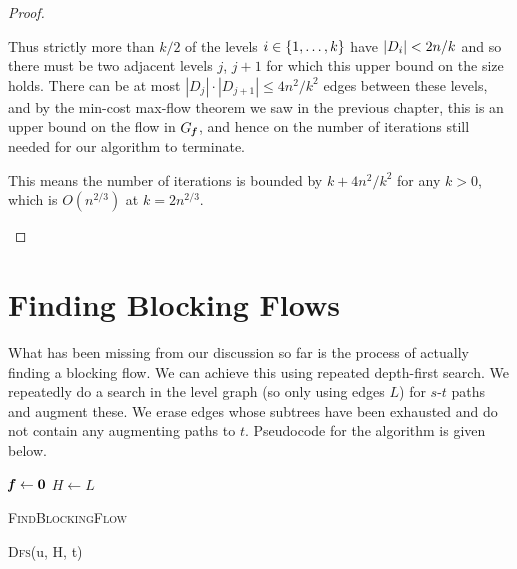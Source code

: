 \begin{proof}
\begin{enumerate}
    Thus strictly more than $k/2$ of the levels $i \in \left\{1,\ldots,k \right\}$
    have $\left|D_i \right| < 2n/k$ and so there must be two adjacent levels $j$, $j+1$
    for which this upper bound on the size holds.
    There can be at most
    $|D_j|\cdot|D_{j+1}| \leq 4n^2/k^2$ edges between these levels, and by the min-cost
    max-flow theorem we saw in the previous chapter, this is an upper bound on the flow
    in $G_{\boldsymbol{\mathit{f}}}$, and hence on the number of iterations still needed for our algorithm to
    terminate.

    This means the number of iterations is bounded by $k + 4n^2/k^2$ for any $k>0$,
    which is $O(n^{2/3})$ at $k=2n^{2/3}$.
  \end{enumerate}
\end{proof}

\section{Finding Blocking Flows}
What has been missing from our discussion so far is the process of actually finding a blocking flow.
We can achieve this using repeated depth-first search. We repeatedly do a search in the level graph (so
only using edges $L$) for $s$-$t$ paths and augment these. We erase edges whose subtrees have been
exhausted and do not contain any augmenting paths to $t$. Pseudocode for the algorithm is given below.

\begin{algorithm}[H]
  \SetAlgoLined
  $\boldsymbol{\mathit{f}} \leftarrow \boldsymbol{0}$\;
  $H \leftarrow L$\;
  \caption{\textsc{FindBlockingFlow}}
\end{algorithm}

\begin{algorithm}[H]
  \SetAlgoLined
  \Return{$\emptyset$}\;
  \caption{\textsc{Dfs}(u, H, t)}
\end{algorithm}

